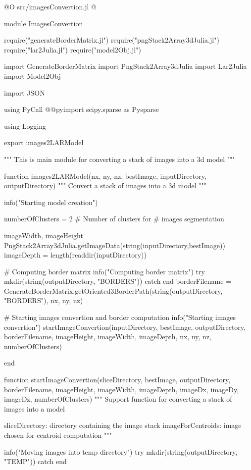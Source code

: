 \documentclass[11pt,oneside]{article}	%
\begin{document}
@O src/imagesConvertion.jl
@{module ImagesConvertion

require("generateBorderMatrix.jl")
require("pngStack2Array3dJulia.jl")
require("lar2Julia.jl")
require("model2Obj.jl")

import GenerateBorderMatrix
import PngStack2Array3dJulia
import Lar2Julia
import Model2Obj

import JSON

using PyCall
@@pyimport scipy.sparse as Pysparse

using Logging

export images2LARModel

"""
This is main module for converting a stack
of images into a 3d model
"""

function images2LARModel(nx, ny, nz, bestImage, inputDirectory, outputDirectory)
  """
  Convert a stack of images into a 3d model
  """

  info("Starting model creation")

  numberOfClusters = 2 # Number of clusters for
                       # images segmentation

  imageWidth, imageHeight = PngStack2Array3dJulia.getImageData(string(inputDirectory,bestImage))
  imageDepth = length(readdir(inputDirectory))

  # Computing border matrix
  info("Computing border matrix")
  try
    mkdir(string(outputDirectory, "BORDERS"))
  catch
  end
  borderFilename = GenerateBorderMatrix.getOriented3BorderPath(string(outputDirectory, "BORDERS"), nx, ny, nz)

  # Starting images convertion and border computation
  info("Starting images convertion")
  startImageConvertion(inputDirectory, bestImage, outputDirectory, borderFilename,
                       imageHeight, imageWidth, imageDepth,
                       nx, ny, nz,
                       numberOfClusters)

end


function startImageConvertion(sliceDirectory, bestImage, outputDirectory, borderFilename,
                              imageHeight, imageWidth, imageDepth,
                              imageDx, imageDy, imageDz,
                              numberOfClusters)
  """
  Support function for converting a stack of images into a model

  sliceDirectory: directory containing the image stack
  imageForCentroids: image chosen for centroid computation
  """

  info("Moving images into temp directory")
  try
    mkdir(string(outputDirectory, "TEMP"))
  catch
  end

}
\end{document}
